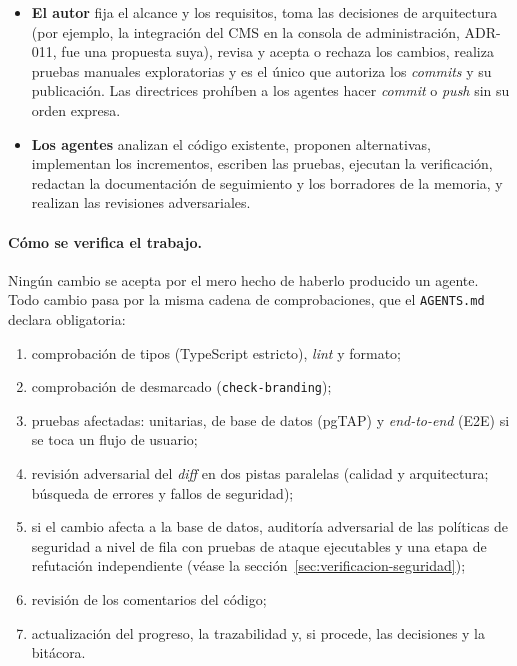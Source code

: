 \begin{itemize}
  \item \textbf{El autor} fija el alcance y los requisitos, toma las decisiones
        de arquitectura (por ejemplo, la integración del CMS en la consola de
        administración, ADR-011, fue una propuesta suya), revisa y acepta o
        rechaza los cambios, realiza pruebas manuales exploratorias y es el
        único que autoriza los \textit{commits} y su publicación. Las
        directrices prohíben a los agentes hacer \textit{commit} o
        \textit{push} sin su orden expresa.
  \item \textbf{Los agentes} analizan el código existente, proponen
        alternativas, implementan los incrementos, escriben las pruebas,
        ejecutan la verificación, redactan la documentación de seguimiento y
        los borradores de la memoria, y realizan las revisiones adversariales.
\end{itemize}

\paragraph{Cómo se verifica el trabajo.}
\label{sec:verificacion-proceso}
Ningún cambio se acepta por el mero hecho de haberlo producido un agente. Todo
cambio pasa por la misma cadena de comprobaciones, que el
\texttt{AGENTS.md} declara obligatoria:

\begin{enumerate}
  \item comprobación de tipos (TypeScript estricto), \textit{lint} y formato;
  \item comprobación de desmarcado (\texttt{check-branding});
  \item pruebas afectadas: unitarias, de base de datos (pgTAP) y
        \textit{end-to-end} (E2E) si se toca un flujo de usuario;
  \item revisión adversarial del \textit{diff} en dos pistas paralelas
        (calidad y arquitectura; búsqueda de errores y fallos de seguridad);
  \item si el cambio afecta a la base de datos, auditoría adversarial de las
        políticas de seguridad a nivel de fila con pruebas de ataque ejecutables
        y una etapa de refutación independiente (véase la
        sección~\ref{sec:verificacion-seguridad});
  \item revisión de los comentarios del código;
  \item actualización del progreso, la trazabilidad y, si procede, las
        decisiones y la bitácora.
\end{enumerate}

